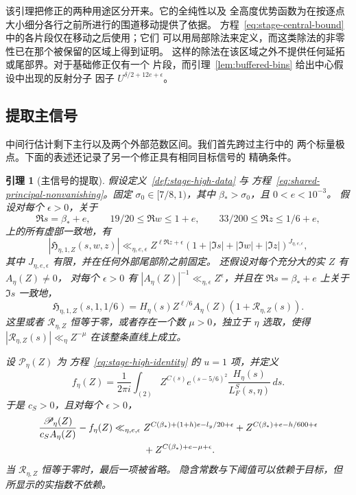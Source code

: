 \documentclass[11pt,a4paper]{article}
\numberwithin{equation}{section}
\numberwithin{figure}{section}
\newtheorem{lemma}[theorem]{引理}
\theoremstyle{definition}
\theoremstyle{remark}
\begin{document}
该引理把修正的两种用途区分开来。它的全纯性以及
全高度优势函数为在按逐点大小细分各行之前所进行的围道移动提供了依据。
方程~\eqref{eq:stage-central-bound} 中的各片段仅在移动之后使用；它们
可以用局部除法来定义，而这类除法的非零性已在那个被保留的区域上得到证明。
这样的除法在该区域之外不提供任何延拓或尾部界。对于基础修正仅有一个
片段，而引理~\ref{lem:buffered-bins} 给出中心假设中出现的反射分子
因子 $U^{\delta/2+12e+\epsilon}$。

\subsection{提取主信号}

中间行估计剩下主行以及两个外部范数区间。我们首先跨过主行中的
两个标量极点。下面的表述还记录了另一个修正具有相同目标信号的
精确条件。

\begin{lemma}[主信号的提取]
\label{lem:principal-residue-interface}
假设定义~\ref{def:stage-high-data} 与
方程~\eqref{eq:shared-principal-nonvanishing}。固定
$\sigma_0\in[7/8,1)$，其中 $\beta_*>\sigma_0$，且 $0<e<10^{-3}$。
假设对每个 $\epsilon>0$，关于
\[
 \Re s=\beta_*+e,\qquad 19/20\le\Re w\le1+e,
 \qquad 33/200\le\Re z\le1/6+e,
\]
上的所有虚部一致地，有
\begin{equation}
 |\mathfrak H_{\eta,1,Z}(s,w,z)|
 \ll_{\eta,e,\epsilon} Z^{\ell\Re z+\epsilon}
  (1+|\Im s|+|\Im w|+|\Im z|)^{J_{\eta,e,\epsilon}},
 \label{eq:principal-correction-bound}
\end{equation}
其中 $J_{\eta,e,\epsilon}$ 有限，并在任何外部尾部阶之前固定。
还假设对每个充分大的实 $Z$ 有 $A_\eta(Z)\ne0$，
对每个 $\epsilon>0$ 有
$|A_\eta(Z)|^{-1}\ll_{\eta,\epsilon}Z^\epsilon$，并且在
$\Re s=\beta_*+e$ 上关于 $\Im s$ 一致地，
\begin{equation}
 \mathfrak H_{\eta,1,Z}(s,1,1/6)
 =H_\eta(s)Z^{\ell/6}A_\eta(Z)(1+\mathcal R_{\eta,Z}(s)).
 \label{eq:principal-correction-residue}
\end{equation}
这里或者 $\mathcal R_{\eta,Z}$ 恒等于零，或者存在一个数
$\mu>0$，独立于 $\eta$ 选取，使得
$|\mathcal R_{\eta,Z}(s)|\ll_\eta Z^{-\mu}$ 在该整条直线上成立。

设 $\mathscr P_\eta(Z)$ 为
方程~\eqref{eq:stage-high-identity} 的 $u=1$ 项，并定义
\[
 f_\eta(Z)=\frac1{2\pi i}\int_{(2)}
    Z^{C(s)}e^{(s-5/6)^2}\frac{H_\eta(s)}{L_F^S(s,\eta)}\,ds.
\]
于是 $c_S>0$，且对每个 $\epsilon>0$，
\begin{align}
 \frac{\mathscr P_\eta(Z)}{c_SA_\eta(Z)}-f_\eta(Z)
 \ll_{\eta,e,\epsilon}{}&
 Z^{C(\beta_*)+(1+h)e-l_y/20+\epsilon}
 +Z^{C(\beta_*)+e-h/600+\epsilon}\notag\\
 &+Z^{C(\beta_*)+e-\mu+\epsilon}.
 \label{eq:principal-remainder-bound}
\end{align}
当 $\mathcal R_{\eta,Z}$ 恒等于零时，最后一项被省略。
隐含常数与下阈值可以依赖于目标，但所显示的实指数不依赖。
\end{lemma}
\end{document}
